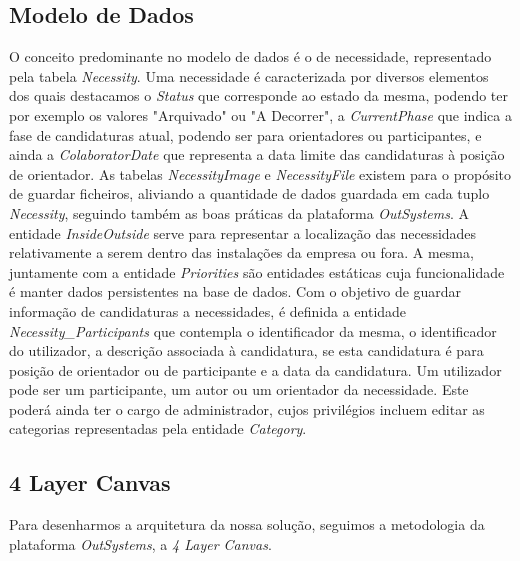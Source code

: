\documentclass[a4paper,openright,12pt]{report}
\begin{document}
\par

\subsection{Modelo de Dados} \label{ModeloDados}
O conceito predominante no modelo de dados é o de necessidade, representado pela tabela \textit{Necessity}. Uma necessidade é caracterizada por diversos elementos dos quais destacamos o \textit{Status} que corresponde ao estado da mesma, podendo ter por exemplo os valores "Arquivado" ou "A Decorrer", a \textit{CurrentPhase} que indica a fase de candidaturas atual, podendo ser para orientadores ou participantes, e ainda a \textit{ColaboratorDate} que representa a data limite das candidaturas à posição de orientador. 
As tabelas \textit{NecessityImage} e \textit{NecessityFile} existem para o propósito de guardar ficheiros, aliviando a quantidade de dados guardada em cada tuplo \textit{Necessity}, seguindo também as boas práticas da plataforma \textit{OutSystems}. A entidade \textit{InsideOutside} serve para representar a localização das necessidades relativamente a serem  dentro das instalações da empresa ou fora. A mesma, juntamente com a entidade \textit{Priorities} são entidades estáticas cuja funcionalidade é manter dados persistentes na base de dados. Com o objetivo de guardar informação de candidaturas a necessidades, é definida a entidade \textit{Necessity_Participants} que contempla o identificador da mesma, o identificador do utilizador, a descrição associada à candidatura, se esta candidatura é para posição de orientador ou de participante e a data da candidatura. Um utilizador pode ser um participante, um autor ou um orientador da necessidade. Este poderá ainda ter o cargo de administrador, cujos privilégios incluem editar as categorias representadas pela entidade \textit{Category}.

\subsection{4 Layer Canvas} \label{4layerCanvas}

Para desenharmos a arquitetura da nossa solução, seguimos a metodologia da plataforma \textit{OutSystems}, a \textit{4 Layer Canvas}.
\end{document}
